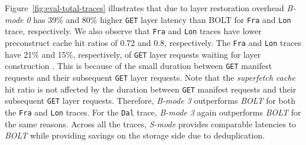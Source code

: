 Figure~\ref{fig:eval-total-traces} illustrates that due to layer restoration overhead
\emph{B-mode 0} has 39\% and 80\% higher \texttt{GET} layer latency
than BOLT for \texttt{Fra} and \texttt{Lon} trace, respectively.
%
We also observe that \texttt{Fra} and \texttt{Lon} traces have lower preconstruct
cache hit ratios of 0.72 and 0.8, respectively.
%
The \texttt{Fra} and \texttt{Lon} traces have 21\% and 15\%, respectively, of \texttt{GET} layer
requests waiting for layer construction .
%
This is because of the small duration between \texttt{GET} manifest requests and
their subsequent \texttt{GET} layer requests.
%
Note that the \emph{superfetch
cache} hit ratio is not affected by the duration between \texttt{GET} manifest
requests and their subsequent \texttt{GET} layer requests.
%
Therefore, \emph{B-mode 3} outperforms \emph{BOLT} for both the \texttt{Fra} and \texttt{Lon}
traces.
For the \texttt{Dal} trace, \emph{B-mode 3} again outperforms \emph{BOLT} for
the same reasons.
%
Across all the traces, \emph{S-mode} provides comparable
latencies to \emph{BOLT} while providing savings on the storage side due to
deduplication.


